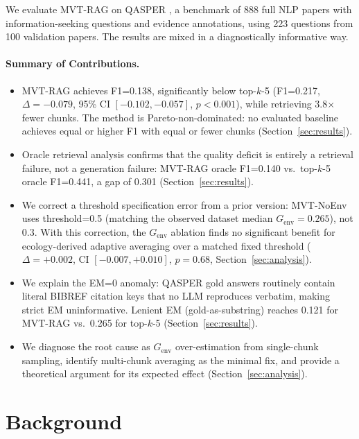 \documentclass[11pt,letterpaper]{article}
\begin{document}
We evaluate MVT-RAG on QASPER \citep{Dasigi2021}, a benchmark of 888 full NLP papers with information-seeking questions
and evidence annotations, using 223 questions from 100 validation papers. The results are mixed in a diagnostically
informative way.

\paragraph{Summary of Contributions.}
\begin{itemize}
  \item MVT-RAG achieves F1=0.138, significantly below top-$k$-5 (F1=0.217, $\Delta=-0.079$, 95\% CI $[-0.102, -0.057]$,
        $p{<}0.001$), while retrieving 3.8$\times$ fewer chunks. The method is Pareto-non-dominated: no evaluated baseline
        achieves equal or higher F1 with equal or fewer chunks (Section~\ref{sec:results}).
  \item Oracle retrieval analysis confirms that the quality deficit is entirely a retrieval failure, not a generation
        failure: MVT-RAG oracle F1=0.140 vs.\ top-$k$-5 oracle F1=0.441, a gap of 0.301 (Section~\ref{sec:results}).
  \item We correct a threshold specification error from a prior version: MVT-NoEnv uses threshold=0.5 (matching the
        observed dataset median $G_{\mathrm{env}}=0.265$), not 0.3. With this correction, the $G_{\mathrm{env}}$ ablation
        finds no significant benefit for ecology-derived adaptive averaging over a matched fixed threshold ($\Delta=+0.002$,
        CI $[-0.007, +0.010]$, $p=0.68$, Section~\ref{sec:analysis}).
  \item We explain the EM=0 anomaly: QASPER gold answers routinely contain literal BIBREF citation keys that no LLM
        reproduces verbatim, making strict EM uninformative. Lenient EM (gold-as-substring) reaches 0.121 for MVT-RAG
        vs.\ 0.265 for top-$k$-5 (Section~\ref{sec:results}).
  \item We diagnose the root cause as $G_{\mathrm{env}}$ over-estimation from single-chunk sampling, identify multi-chunk
        averaging as the minimal fix, and provide a theoretical argument for its expected effect
        (Section~\ref{sec:analysis}).
\end{itemize}

\section{Background}
\end{document}
